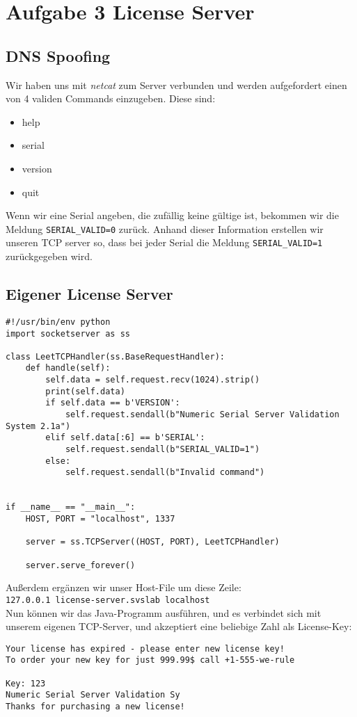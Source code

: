 \documentclass[10pt,a4paper]{article}
\begin{document}
\setcounter{section}{3}
\setcounter{subsection}{0}
\section*{Aufgabe 3 License Server}
\subsection{DNS Spoofing}
Wir haben uns mit \textit{netcat} zum Server verbunden und werden aufgefordert einen von 4 validen Commands einzugeben. Diese sind:
\begin{itemize}
\item help
\item serial
\item version
\item quit
\end{itemize}
Wenn wir eine Serial angeben, die zufällig keine gültige ist, bekommen wir die Meldung \texttt{SERIAL\_VALID=0} zurück. Anhand dieser Information erstellen wir unseren TCP server so, dass bei jeder Serial die Meldung \texttt{SERIAL\_VALID=1} zurückgegeben wird.
\subsection{Eigener License Server}
\begin{verbatim}
#!/usr/bin/env python
import socketserver as ss

class LeetTCPHandler(ss.BaseRequestHandler):
    def handle(self):
        self.data = self.request.recv(1024).strip()
        print(self.data)
        if self.data == b'VERSION':
            self.request.sendall(b"Numeric Serial Server Validation System 2.1a")
        elif self.data[:6] == b'SERIAL':
            self.request.sendall(b"SERIAL_VALID=1")
        else:
            self.request.sendall(b"Invalid command")


if __name__ == "__main__":
    HOST, PORT = "localhost", 1337

    server = ss.TCPServer((HOST, PORT), LeetTCPHandler)

    server.serve_forever()
\end{verbatim}

Außerdem ergänzen wir unser Host-File um diese Zeile:\\
\texttt{127.0.0.1 license-server.svslab localhost} \\
Nun können wir das Java-Programm ausführen, und es verbindet sich mit unserem
eigenen TCP-Server, und akzeptiert eine beliebige Zahl als License-Key:
\begin{verbatim}
Your license has expired - please enter new license key!
To order your new key for just 999.99$ call +1-555-we-rule

Key: 123
Numeric Serial Server Validation Sy
Thanks for purchasing a new license!
\end{verbatim}
\end{document}
